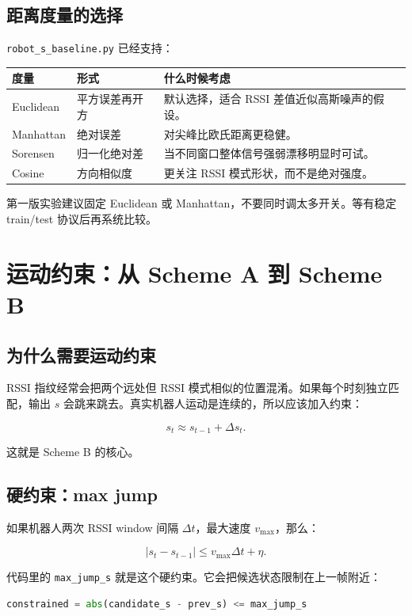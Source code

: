 \documentclass[11pt,a4paper,openany]{report}
\newcommand{\file}[1]{\nolinkurl{#1}}
\newcommand{\param}[1]{\nolinkurl{#1}}
\begin{document}
\section{距离度量的选择}

\file{robot_s_baseline.py} 已经支持：

\begin{longtable}{p{}p{}p{}}
\toprule
度量 & 形式 & 什么时候考虑 \\
\midrule
Euclidean & 平方误差再开方 & 默认选择，适合 RSSI 差值近似高斯噪声的假设。 \\
Manhattan & 绝对误差 & 对尖峰比欧氏距离更稳健。 \\
Sorensen & 归一化绝对差 & 当不同窗口整体信号强弱漂移明显时可试。 \\
Cosine & 方向相似度 & 更关注 RSSI 模式形状，而不是绝对强度。 \\
\bottomrule
\end{longtable}

第一版实验建议固定 Euclidean 或 Manhattan，不要同时调太多开关。等有稳定 train/test 协议后再系统比较。

\chapter{运动约束：从 Scheme A 到 Scheme B}
\label{chap:motion}

\section{为什么需要运动约束}

RSSI 指纹经常会把两个远处但 RSSI 模式相似的位置混淆。如果每个时刻独立匹配，输出 \(s\) 会跳来跳去。真实机器人运动是连续的，所以应该加入约束：

\[
  s_t \approx s_{t-1} + \Delta s_t.
\]

这就是 Scheme B 的核心。

\section{硬约束：max jump}

如果机器人两次 RSSI window 间隔 \(\Delta t\)，最大速度 \(v_{\max}\)，那么：

\[
  |s_t - s_{t-1}| \le v_{\max}\Delta t + \eta.
\]

代码里的 \param{max_jump_s} 就是这个硬约束。它会把候选状态限制在上一帧附近：

\begin{lstlisting}[language=Python]
constrained = abs(candidate_s - prev_s) <= max_jump_s
\end{lstlisting}
\end{document}
